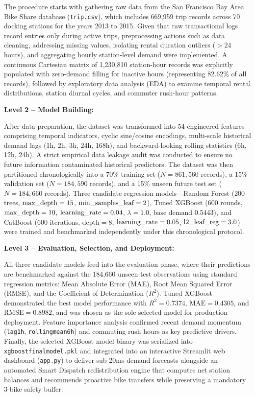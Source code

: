 \documentclass[12pt, a4paper]{article}
\renewcommand{\_}{\textunderscore\allowbreak}
\begin{document}
The procedure starts with gathering raw data from the San Francisco Bay Area Bike Share database (\texttt{trip.csv}), which includes 669,959 trip records across 70 docking stations for the years 2013 to 2015. Given that raw transactional logs record entries only during active trips, preprocessing actions such as data cleaning, addressing missing values, isolating rental duration outliers ($> 24$ hours), and aggregating hourly station-level demand were implemented. A continuous Cartesian matrix of 1,230,810 station-hour records was explicitly populated with zero-demand filling for inactive hours (representing 82.62\% of all records), followed by exploratory data analysis (EDA) to examine temporal rental distributions, station diurnal cycles, and commuter rush-hour patterns.

\noindent \textbf{Level 2 -- Model Building:}

After data preparation, the dataset was transformed into 54 engineered features comprising temporal indicators, cyclic sine/cosine encodings, multi-scale historical demand lags (1h, 2h, 3h, 24h, 168h), and backward-looking rolling statistics (6h, 12h, 24h). A strict empirical data leakage audit was conducted to ensure no future information contaminated historical predictors. The dataset was then partitioned chronologically into a 70\% training set ($N = 861,560$ records), a 15\% validation set ($N = 184,590$ records), and a 15\% unseen future test set ($N = 184,660$ records). Three candidate regression models---Random Forest (200 trees, $\text{max\_depth} = 15$, $\text{min\_samples\_leaf} = 2$), Tuned XGBoost (600 rounds, $\text{max\_depth} = 10$, $\text{learning\_rate} = 0.04$, $\lambda = 1.0$, base demand 0.5443), and CatBoost (600 iterations, $\text{depth} = 8$, $\text{learning\_rate} = 0.05$, $\text{l2\_leaf\_reg} = 3.0$)---were trained and benchmarked independently under this chronological protocol.

\noindent \textbf{Level 3 -- Evaluation, Selection, and Deployment:}

All three candidate models feed into the evaluation phase, where their predictions are benchmarked against the 184,660 unseen test observations using standard regression metrics: Mean Absolute Error (MAE), Root Mean Squared Error (RMSE), and the Coefficient of Determination ($R^2$). Tuned XGBoost demonstrated the best model performance with $R^2 = 0.7374$, $\text{MAE} = 0.4305$, and $\text{RMSE} = 0.8982$, and was chosen as the sole selected model for production deployment. Feature importance analysis confirmed recent demand momentum (\texttt{lag\_1h}, \texttt{rolling\_mean\_6h}) and commuting rush hours as key predictive drivers. Finally, the selected XGBoost model binary was serialized into \texttt{xgboost\_final\_model.pkl} and integrated into an interactive Streamlit web dashboard (\texttt{app.py}) to deliver sub-20ms demand forecasts alongside an automated Smart Dispatch redistribution engine that computes net station balances and recommends proactive bike transfers while preserving a mandatory 3-bike safety buffer.
\end{document}
